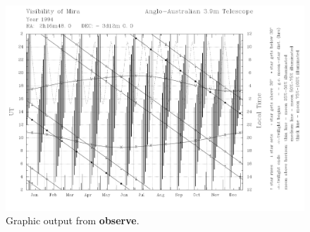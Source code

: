 \documentclass[11pt]{article}
\newcommand{\xlabel}[1]{}
\begin{document}
\newpage

\begin{figure}
\begin{center}
\includegraphics[angle=-180,width=\textwidth]{sun146_fig}
\vspace{5mm}
\caption{Graphic output from {\bf{observe}}.}
\label{fig_output}
\xlabel{fig_output}
\end{center}
\end{figure}
\end{document}
